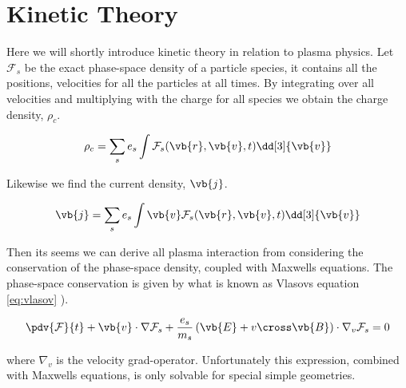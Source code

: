 \section{Kinetic Theory}
    Here we will shortly introduce kinetic theory in relation to plasma physics.
	Let \(\mathcal{F}_s\) be the exact phase-space density of a particle species,
	it contains all the positions, velocities for all the particles at
	all times. By integrating over all velocities and multiplying with the charge
	for all species we obtain the charge density, \(\rho_c\).

	\[\rho_c = \sum_s e_s \int \mathcal{F}_s(\vb{r},\vb{v},t)\dd[3]{\vb{v}}\]

	Likewise we find the current density, \(\vb{j}\).

	\[\vb{j} = \sum_s e_s \int \vb{v}\mathcal{F}_s(\vb{r},\vb{v},t)\dd[3]{\vb{v}}\]

	Then its seems we can derive all plasma interaction from considering
	the conservation of the phase-space density, coupled with Maxwells equations.
	The phase-space conservation is given by what is known as Vlasovs equation \cref{eq:vlasov}
	\citep{pecseli_waves_2012}).

	\begin{align}
		\pdv{\mathcal{F}}{t} + \vb{v}\cdot\nabla\mathcal{F}_s + \frac{e_s}{m_s}\left( \vb{E} + v\cross\vb{B} \right) \cdot \nabla_v\mathcal{F}_s = 0 \label{eq:vlasov}
	\end{align}

	where \(\nabla_v\) is the velocity grad-operator.
	Unfortunately this expression, combined with Maxwells equations, is only solvable
	for special simple geometries.
